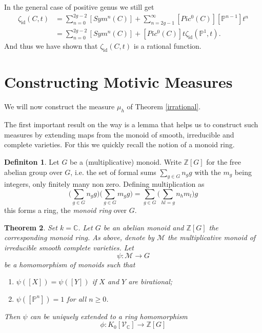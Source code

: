 \documentclass[11pt, a4paper, german]{article}
\theoremstyle{plain}
\newtheorem{theorem}{Theorem}[section]
\theoremstyle{definition}
\newtheorem{definition}[theorem]{Definiton}
\newcommand{\gring}[1][k]{K_0[\mathcal{V}_#1]}
\begin{document}
In the general case of positive genus we still get
\begin{align*}
    \zeta_{\mathrm{id}}(C,t) &= \sum_{n=0}^{2g-2} [Sym^n(C)] + \sum_{n=2g-1}^\infty [Pic^0(C)][\mathbb{P}^{n-1}]t^n\\
                             &= \sum_{n=0}^{2g-2} [Sym^n(C)] + [Pic^0(C)]t\zeta_{\mathrm{id}}(\mathbb{P}^1, t).
\end{align*}
And thus we have shown that $\zeta_{\mathrm{id}}(C,t)$ is a rational function.

\section{Constructing Motivic Measures}
\label{const}
We will now construct the measure $\mu_h$ of Theorem \ref{irrational}.

The first important result on the way is a lemma that helps us to construct such measures by extending maps from the monoid of smooth, irreducible
and complete varieties. For this we quickly recall the notion of a monoid ring.

\begin{definition}
    Let $G$ be a (multiplicative) monoid. Write $\mathbb{Z}[G]$ for the free abelian group over $G$, i.e. the set of formal sums
    $\sum_{g \in G} n_g g$ with the $m_g$ being integers, only finitely many non zero.
    Defining multiplication as
    \[
        \Big(\sum_{g \in G} n_g g\Big)\Big(\sum_{g \in G} m_g g \Big) = \sum_{g \in G} \Big(\sum_{hl = g} n_h m_l\Big) g
    \]
    this forms a ring, the \emph{monoid ring} over $G$.
\end{definition}

\begin{theorem}
    \label{th1}
    Set $k = \mathbb{C}$. Let $G$ be an abelian monoid and $\mathbb{Z}[G]$ the corresponding monoid ring. As above, denote
    by $\mathcal{M}$ the multiplicative monoid of irreducible smooth complete varieties. Let
    \[
        \psi \colon \mathcal{M} \to G
    \]
    be a homomorphism of monoids such that
    \begin{enumerate}[label=\rm{\roman*)}]
        \item $\psi([X]) = \psi([Y])$ if $X$ and $Y$ are birational;
        \item $\psi([\mathbb{P}^n]) = 1$ for all $n \ge 0$.
    \end{enumerate}
    Then $\psi$ can be uniquely extended to a ring homomorphism 
    \[
        \phi \colon \gring[\mathbb{C}] \to \mathbb{Z} [G]
    \]
\end{theorem}
\end{document}
